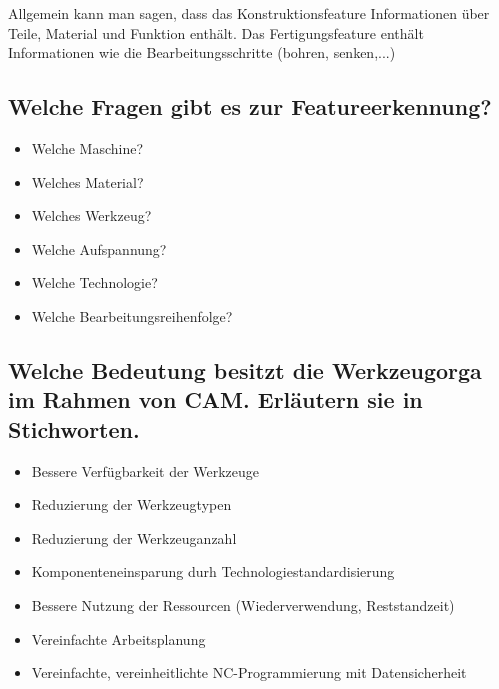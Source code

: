 Allgemein kann man sagen, dass das Konstruktionsfeature Informationen über Teile, Material und Funktion enthält. Das Fertigungsfeature enthält Informationen wie die Bearbeitungsschritte (bohren, senken,...)

\begin{center}
\begin{figure}[h]
\begin{minipage}[hbt]{7cm}
\end{minipage}
%
\begin{minipage}[hbt]{7cm}
\end{minipage}
\end{figure}
\end{center}


\subsection*{Welche Fragen gibt es zur Featureerkennung?}

\begin{itemize}
\item Welche Maschine?
\item Welches Material?
\item Welches Werkzeug?
\item Welche Aufspannung?
\item Welche Technologie?
\item Welche Bearbeitungsreihenfolge?
\end{itemize}


\subsection*{Welche Bedeutung besitzt die Werkzeugorga im Rahmen von CAM. Erläutern sie in Stichworten.}


\begin{itemize}
\item Bessere Verfügbarkeit der Werkzeuge
\item Reduzierung der Werkzeugtypen
\item Reduzierung der Werkzeuganzahl
\item Komponenteneinsparung durh Technologiestandardisierung
\item Bessere Nutzung der Ressourcen (Wiederverwendung, Reststandzeit)
\item Vereinfachte Arbeitsplanung
\item Vereinfachte, vereinheitlichte NC-Programmierung mit Datensicherheit
\end{itemize}


